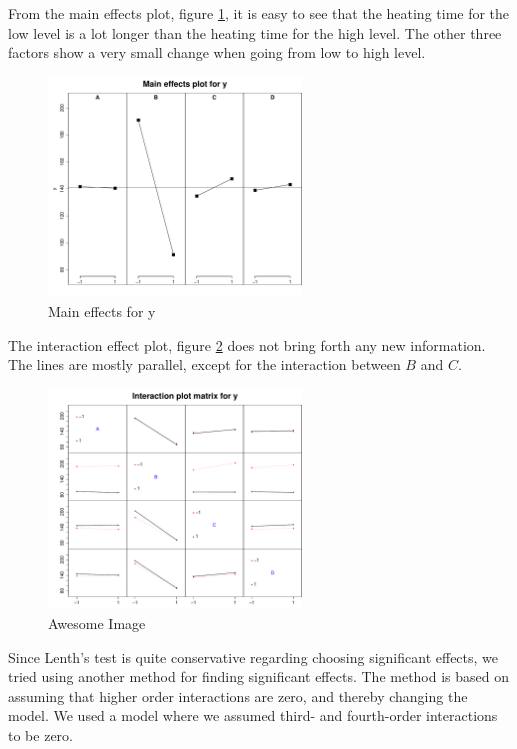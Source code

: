 From the main effects plot, figure \ref{fig:mainEff}, it is easy to see that the heating time for the low level is a lot longer than the heating time for the high level. The other three factors show a very small change when going from low to high level.

\begin{figure}[H]
    \centering
    \includegraphics[width=0.6\textwidth]{PDF/mainEffects4factors.pdf}
    \caption{Main effects for y}
    \label{fig:mainEff}
\end{figure}

The interaction effect plot, figure \ref{fig:interaction} does not bring forth any new information. The lines are mostly parallel, except  for the interaction between $B$ and $C$.

\begin{figure}[H]
    \centering
    \includegraphics[width=0.6\textwidth]{PDF/interactionPlot4factors.pdf}
    \caption{Awesome Image}
    \label{fig:interaction}
\end{figure}

Since Lenth's test is quite conservative regarding choosing significant effects, we tried using another method for finding significant effects. The method is based on assuming that higher order interactions are zero, and thereby changing the model. We used a model where we assumed third- and fourth-order interactions to be zero.

